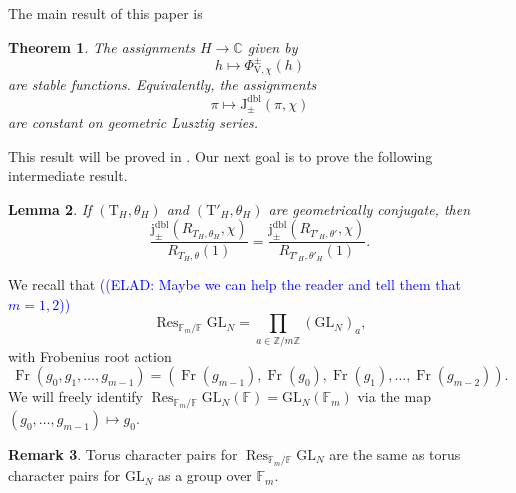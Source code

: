 \documentclass[12pt, reqno]{amsart}
\newtheorem{theorem}{Theorem}[section]
\newtheorem{lemma}[theorem]{Lemma}
\theoremstyle{definition}
\theoremstyle{definition}
\newtheorem{remark}[theorem]{Remark}
\theoremstyle{definition}
\newcommand{\cComplex}{\mathbb{C}}
\newcommand{\hermitianSpace}{\mathrm{V}}
\newcommand{\trace}{\operatorname{tr}}
\newcommand{\GL}{\mathrm{GL}}
\newcommand{\finiteField}{\mathbb{F}}
\newcommand{\finiteFieldExtension}[1]{\finiteField_{#1}}
\newcommand{\Frobenius}{\operatorname{Fr}}
\newcommand{\restrictionOfScalars}[3]{\operatorname{Res}_{#1 \slash #2}{#3}}
\newcommand{\genHermitianJacobiKernel}[2]{\Phi^{\pm}_{#1,#2}}
\newcommand{\dblJacobiSumScalar}[2]{\mathrm{J}_{\pm}^{\mathrm{dbl}}\left(#1, #2\right)}
\newcommand{\dblVirtualJacobiSumScalar}[2]{\mathrm{j}_{\pm}^{\mathrm{dbl}}\left(#1, #2\right)}
\newcommand{\algebraicGroup}[1]{\boldsymbol{\mathrm{#1}}}
\newcommand{\RTTheta}[2]{R_{#1, #2}}
\newcommand{\calvin}[1]{\textcolor{orange}{\sffamily ((CALVIN: #1))}}
\newcommand{\elad}[1]{\textcolor{blue}{\sffamily ((ELAD: #1))}}
\begin{document}
The main result of this paper is 
\begin{theorem}
\label{thm:Phi_stable}
	The assignments $H \to \cComplex$ given by $$h \mapsto \genHermitianJacobiKernel{\hermitianSpace}{\chi}\left(h\right)$$ are stable functions. Equivalently, the assignments $$\pi \mapsto \dblJacobiSumScalar{\pi}{\chi}$$ are constant on geometric Lusztig series.
\end{theorem}
This result will be proved in . Our next goal is to prove the following intermediate result.
\begin{lemma}
\label{lem:indep_geo_conj}
    If $(\algebraicGroup{T}_H,\theta_H)$ and $(\algebraicGroup{T}'_H, \theta_H)$ are geometrically conjugate, then $$\frac{\dblVirtualJacobiSumScalar{\RTTheta{T_H}{\theta_H}}{\chi}}{\RTTheta{T_H}{\theta}(1)} = \frac{\dblVirtualJacobiSumScalar{\RTTheta{T'_H}{\theta'}}{\chi}}{\RTTheta{T'_H}{\theta'_H}\left(1\right)}.$$
\end{lemma}

We recall that \elad{Maybe we can help the reader and tell them that $m=1,2$} $$
	\restrictionOfScalars{\finiteFieldExtension{m}}{\finiteField}{\algebraicGroup{\GL}_N} = \prod_{a \in \mathbb{Z}/m\mathbb{Z}} \left(\algebraicGroup{\GL}_N\right)_a,
$$
with Frobenius root action $$\Frobenius(g_0,g_1, \hdots, g_{m-1}) = (\Frobenius(g_{m-1}), \Frobenius(g_0), \Frobenius(g_1), \hdots, \Frobenius(g_{m-2})).$$ We will freely identify $\restrictionOfScalars{\finiteFieldExtension{m}}{\finiteField}{\algebraicGroup{\GL}_N}(\finiteField) = \GL_N(\finiteFieldExtension{m})$ via the map $\left(g_0,\dots,g_{m-1}\right) \mapsto g_0$.

\begin{remark}
Torus character pairs for $\restrictionOfScalars{\finiteFieldExtension{m}}{\finiteField}{\algebraicGroup{\GL}_N}$ are the same as torus character pairs for $\algebraicGroup{\GL}_N$ as a group over $\finiteFieldExtension{m}$.
\end{remark}

\end{document}
